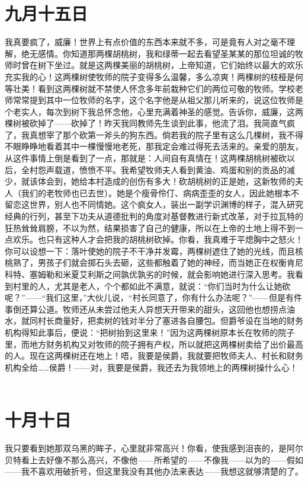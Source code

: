 \documentclass[12pt,oneside]{book}
\begin{document}
\chapter{九月十五日}
我真要疯了，威廉！世界上有点价值的东西本来就不多，可是竟有人对之毫不理解，绝无感情。你知道那两棵胡桃树，我和绿蒂一起去看望圣某某的那位坦诚的牧师时曾在树下坐过。就是这两棵美丽的胡桃树，上帝知道，它们始终以最大的欢乐充实我的心！这两棵树使牧师的院子变得多么温馨，多么凉爽！两棵树的枝桠是何等壮美！看到这两棵树就不禁使人怀念多年前栽种它们的两位可敬的牧师。学校老师常常提到其中一位牧师的名字，这个名字他是从祖父那儿听来的，说这位牧师是个老实人，每次到树下我总怀念他，心里充满着神圣的感觉。告诉你，威廉，这两棵树被砍掉了——砍掉了！昨天我同教师先生谈到此事，他流了泪。我简直气疯了，我真想宰了那个砍第一斧头的狗东西。倘若我的院子里有这么几棵树，我不得不眼睁睁地看着其中一棵慢慢地老死，那我定会难过得死去活来的。亲爱的朋友，从这件事情上倒是看到了一点，那就是：人间自有真情在！这两棵胡桃树被砍以后，全村怨声载道，愤愤不平。我希望牧师夫人看到黄油、鸡蛋和别的贡品的减少，就该体会到，她给本村造成的创伤有多大！砍胡桃树的正是她，这新牧师的夫人（我们的老牧师也已去世）。她是个瘦骨伶仃、病病歪歪的女人，因此她根本不留恋这世界，别人也不同情她。这个疯女人，装出一副学识渊博的样子，混入研究经典的行列，甚至下功夫从道德批判的角度对基督教进行新式改革，对于拉瓦特的狂热耸耸肩膀，不以为然，结果损害了自己的健康，所以在上帝的土地上得不到一点欢乐。也只有这种人才会把我的胡桃树砍掉。你看，我真难于平熄胸中之怒火！你可以设想一下：落叶使她的院子不干净并发霉，两棵树遮住了她的光线，而且核桃熟了，男孩子们就会掷石头去砸，这些都触着了她的神经，而当她正在权衡肯尼科特、塞姆勒和米夏艾利斯之间孰优孰劣的时候，就会影响她进行深入思考。我看到村里的人，尤其是老人，个个都如此不满意，就说：“你们当时为什么让她砍呢？”——“我们这里，”大伙儿说，“村长同意了，你有什么办法呢？”——但是有件事倒还算公道。牧师还从未尝过他夫人异想天开带来的甜头，这回他也想捞点油水，就同村长商量好，把卖树的钱对半分了塞进各自腰包。但爵爷设在当地的财务机构得知此事后，便说：“把树抬到这里来！”因为这两棵树原本长在牧师的院子里，而地方财务机构又对牧师的院子拥有产权，所以就把这两棵树卖给了出价最高的人。现在这两棵树还在地上！唔，我要是侯爵，我就要把牧师夫人、村长和财务机构全给……侯爵！——对，我要是侯爵，我还去为我领地上的两棵树操什么心！
　　

\chapter{十月十日}
我只要看到她那双乌黑的眸子，心里就非常高兴！你看，使我感到沮丧的，是阿尔贝特看上去好像不那么高兴，不像他——所希望的——不像我——以为的——假如——我不喜欢用破折号，但这里我没有其他办法来表达——我想这就够清楚的了。
　　
\end{document}
